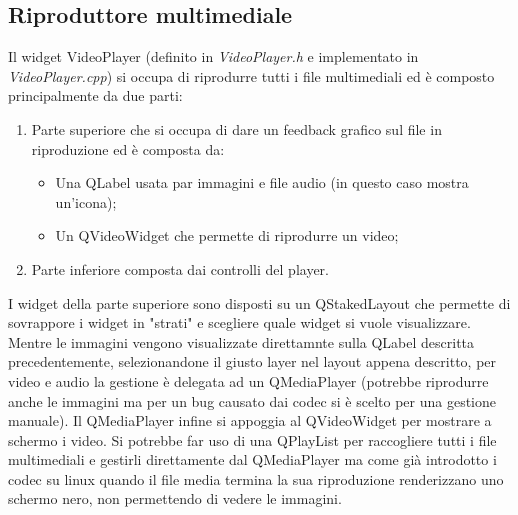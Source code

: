 \subsection{Riproduttore multimediale}
Il widget VideoPlayer (definito in \emph{VideoPlayer.h} e implementato in \emph{VideoPlayer.cpp}) si occupa di riprodurre tutti i file multimediali ed è composto principalmente 
da due parti:
\begin{enumerate}
    \item Parte superiore che si occupa di dare un feedback grafico sul file in riproduzione ed è composta da:
    \begin{itemize}
        \item Una QLabel usata par immagini e file audio (in questo caso mostra un'icona);
        \item Un QVideoWidget che permette di riprodurre un video;
    \end{itemize}
    \item Parte inferiore composta dai controlli del player.
\end{enumerate}
I widget della parte superiore sono disposti su un QStakedLayout che permette di sovrappore i widget in "strati" e scegliere quale widget si vuole visualizzare.
Mentre le immagini vengono visualizzate direttamnte sulla QLabel descritta precedentemente, selezionandone il giusto layer nel layout appena descritto, per video e audio
la gestione è delegata ad un QMediaPlayer (potrebbe riprodurre anche le immagini ma per un bug causato dai codec si è scelto per una gestione manuale).
Il QMediaPlayer infine si appoggia al QVideoWidget per mostrare a schermo i video. Si potrebbe far uso di una QPlayList per raccogliere tutti i file multimediali
e gestirli direttamente dal QMediaPlayer ma come già introdotto i codec su linux quando il file media termina la sua riproduzione renderizzano uno schermo nero, non permettendo 
di vedere le immagini.